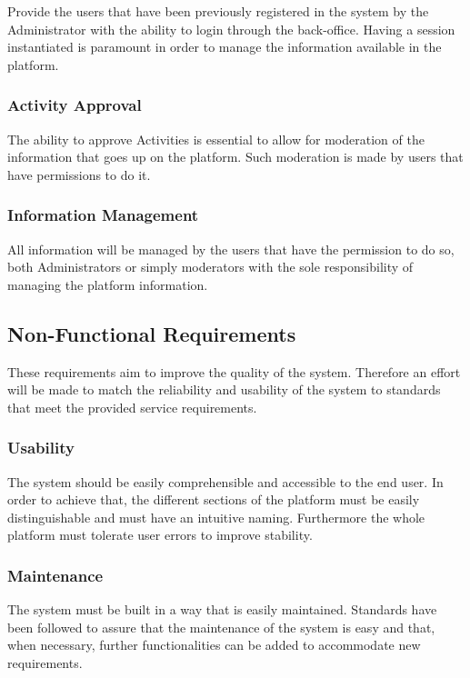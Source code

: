 \documentclass[a4paper,12pt,journal,twoside,compsoc]{PPIEEEtran}
\begin{document}
Provide the users that have been previously registered in the system by the Administrator with the ability to login through the back-office. Having a session instantiated is paramount in order to manage the information available in the platform.

\subsubsection{Activity Approval}

The ability to approve Activities is essential to allow for moderation of the information that goes up on the platform. Such moderation is made by users that have permissions to do it.

\subsubsection{Information Management}

All information will be managed by the users that have the permission to do so, both Administrators or simply moderators with the sole responsibility of managing the platform information.

\subsection{Non-Functional Requirements}

These requirements aim to improve the quality of the system. Therefore an effort will be made to match the reliability and usability of the system to standards that meet the provided service requirements.

\subsubsection{Usability}

The system should be easily comprehensible and accessible to the end user. In order to achieve that, the different sections of the platform must be easily distinguishable and must have an intuitive naming. Furthermore the whole platform must tolerate user errors to improve stability.

\subsubsection{Maintenance}

The system must be built in a way that is easily maintained. Standards have been followed to assure that the maintenance of the system is easy and that, when necessary, further functionalities can be added to accommodate new requirements.
\end{document}
